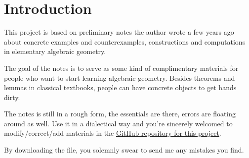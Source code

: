 \documentclass[../main.tex]{subfiles}
\begin{document}
\section{Introduction}\label{sec:Introduction}


This project is based on preliminary notes the author wrote a few years ago 
about concrete examples and counterexamples, constructions and computations in elementary algebraic geometry.

The goal of the notes is to serve as some kind of complimentary materials for people who want
to start learning algebraic geometry. Besides theorems and lemmas in classical textbooks,
people can have concrete objects to get hands dirty. 

The notes is still in a rough form, the essentials are there, errors are floating around as well. 
Use it in a dialectical way and you're sincerely welcomed to modify/correct/add materials in the \href{https://github.com/Waerden001/Examples-and-Counterexamples-in-Elementary-Algebraic-Geometry}{GitHub repository for this project}. 

By downloading the file, you solemnly swear to send me any mistakes you find.
\end{document}
